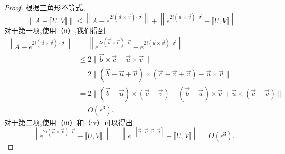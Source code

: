 \begin{proof}
	根据三角形不等式,
	$$
	\|A-\llbracket U, V \rrbracket\| \leq\left\|A-e^{2 i(\vec{u} \times \vec{v}) \cdot \vec{\sigma}}\right\|+\left\|e^{2 i(\vec{u} \times \vec{v}) \cdot \vec{\sigma}}-\llbracket U, V \rrbracket\right\| .	
	$$			
	对于第一项,使用（ii）,我们得到
	$$
	\begin{aligned}
		\left\|A-e^{2 i(\vec{u} \times \vec{v}) \cdot \vec{\sigma}}\right\| & =\left\|e^{2 i(\vec{b} \times \vec{c}) \cdot \vec{\sigma}}-e^{2 i(\vec{u} \times \vec{v}) \cdot \vec{\sigma}}\right\| \\
		& \leq 2\|\vec{b} \times \vec{c}-\vec{u} \times \vec{v}\| \\
		& =2\|(\vec{b}-\vec{u}+\vec{u}) \times(\vec{c}-\vec{v}+\vec{v})-\vec{u} \times \vec{v}\| \\
		& =2\|(\vec{b}-\vec{u}) \times(\vec{c}-\vec{v})+(\vec{b}-\vec{u}) \times \vec{v}+\vec{u} \times(\vec{c}-\vec{v})\| \\
		& =O\left(\epsilon^3\right) .
	\end{aligned}
	$$
	对于第二项,使用（iii）和（iv）可以得出
	$$
	\left\|e^{2 i(\vec{u} \times \vec{v}) \cdot \vec{\sigma}}-\llbracket U, V \rrbracket\right\|=\left\|e^{-[\vec{u} \cdot \vec{\sigma}, \vec{v} \cdot \vec{\sigma}]}-\llbracket U, V \rrbracket\right\|=O\left(\epsilon^3\right).
	$$
\end{proof}

